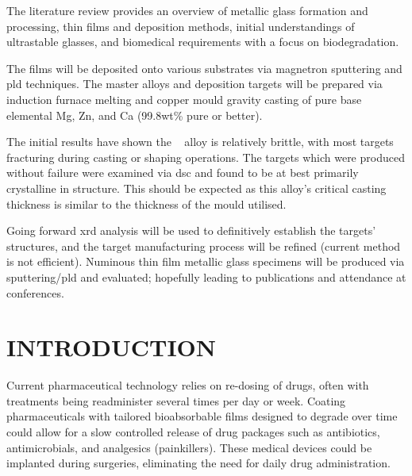 \documentclass[a4paper,12pt,oneside]{report}%
\begin{document}
The literature review provides an overview of metallic glass formation and processing, thin films and deposition methods, initial understandings of ultrastable glasses, and biomedical requirements with a focus on biodegradation. 

The films will be deposited onto various substrates via magnetron sputtering and \gls{pld} techniques. The master alloys and deposition targets will be prepared via induction furnace melting and copper mould gravity casting of pure base elemental Mg, Zn, and Ca (99.8wt\% pure or better).

The initial results have shown the \MgZnCa~ alloy is relatively brittle, with most targets fracturing during casting or shaping operations. The targets which were produced without failure were examined via \acrshort{dsc} and found to be at best primarily crystalline in structure. This should be expected as this alloy's critical casting thickness is similar to the thickness of the mould utilised. 

Going forward \acrshort{xrd} analysis will be used to definitively establish the targets' structures, and the target manufacturing process will be refined (current method is not efficient). Numinous thin film metallic glass specimens will be produced via sputtering/\gls{pld} and evaluated; hopefully leading to publications and attendance at conferences.


\newpage
\tableofcontents\newpage
{}
\listoffigures\newpage
\listoftables\newpage
\clearpage %


\chapter{INTRODUCTION}
\glsresetall
{}
Current pharmaceutical technology relies on re-dosing of drugs, often with treatments being readminister several times per day or week. Coating pharmaceuticals with tailored bioabsorbable films designed to degrade over time could allow for a slow controlled release of drug packages such as antibiotics, antimicrobials, and analgesics (painkillers). These medical devices could be implanted during surgeries, eliminating the need for daily drug administration. 
\end{document}
